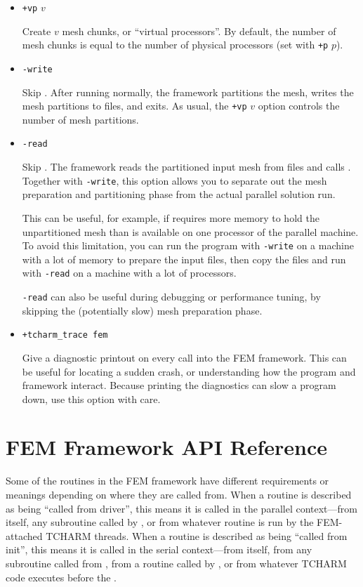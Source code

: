 \documentclass[10pt]{article}
\begin{document}
\begin{itemize}
\item {\tt +vp} $v$  

Create $v$ mesh chunks, or ``virtual processors''.
By default, the number of mesh chunks is equal to the number of 
physical processors (set with {\tt +p} $p$).


\item {\tt -write}

Skip .
After running  normally, the framework partitions the mesh, 
writes the mesh partitions to files, and exits.  As usual, the
{\tt +vp} $v$ option controls the number of mesh partitions.


\item {\tt -read}

Skip .
The framework reads the partitioned input mesh from files
and calls .  Together with {\tt -write}, this option
allows you to separate out the mesh preparation and partitioning 
phase from the actual parallel solution run.

This can be useful, for example, if  requires more memory 
to hold the unpartitioned mesh than is available on one processor of 
the parallel machine.  To avoid this limitation, you can run the program
with {\tt -write} on a machine with a lot of memory to prepare the input
files, then copy the files and run with {\tt -read} on a machine with 
a lot of processors.

{\tt -read} can also be useful during debugging or performance tuning, 
by skipping the (potentially slow) mesh preparation phase.


\item {\tt +tcharm\_trace fem}

Give a diagnostic printout on every call into the FEM framework.
This can be useful for locating a sudden crash, or understanding
how the program and framework interact.  Because printing the 
diagnostics can slow a program down, use this option with care.

\end{itemize}


\section{FEM Framework API Reference}

Some of the routines in the FEM framework have different requirements or meanings
depending on where they are called from.  When a routine is described
as being ``called from driver'', this means it is called in the parallel
context---from  itself, any subroutine called by ,
or from whatever routine is run by the FEM-attached TCHARM threads.
When a routine is described as being ``called from init'', this means it is 
called in the serial context---from  itself, from any subroutine
called from , from a routine called by ,
or from whatever TCHARM code executes before the .
\end{document}
